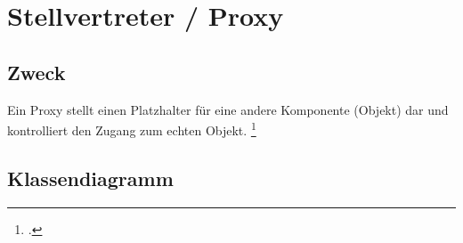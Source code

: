 \documentclass{lehramt-informatik}
\begin{document}

\chapter{Stellvertreter / Proxy}

\begin{quellen}
\item \cite{wiki:stellvertreter}
\item \cite[Seite 176-185]{gof}
\item \cite[Kapitel 8.4.4, Seite 256-262]{schatten}
\item \cite[Kapitel 5.5, Seite 89-92]{eilebrecht}
\item \cite[Kapitel 21, Seite 241-268]{siebler}
\end{quellen}

%

\section{Zweck}

Ein Proxy stellt einen Platzhalter für eine andere Komponente (Objekt)
dar und kontrolliert den Zugang zum echten Objekt.
\footcite[Seite 89]{eilebrecht}

%

\section{Klassendiagramm}

%
\end{document}
